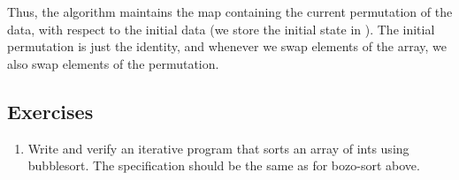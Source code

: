 Thus, the algorithm maintains the map containing the current permutation of
the data, with respect to the initial data (we store the initial state in
).
The initial permutation is just the identity, and whenever we swap elements of
the array, we also swap elements of the permutation.

\subsection*{Exercises}
\begin{enumerate}
\item
Write and verify an iterative program that sorts an array of ints using
bubblesort. The specification should be the same as for bozo-sort above.
\end{enumerate}

